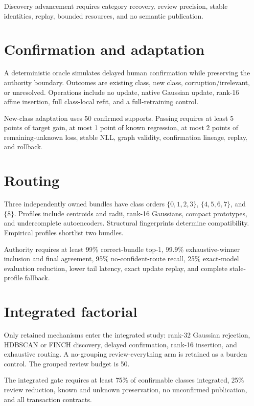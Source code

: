 \documentclass[12pt,oneside]{report}
\begin{document}
Discovery advancement requires category recovery, review precision, stable
identities, replay, bounded resources, and no semantic publication.

\section{Confirmation and adaptation}

A deterministic oracle simulates delayed human confirmation while preserving
the authority boundary. Outcomes are existing class, new class,
corruption/irrelevant, or unresolved. Operations include no update, native
Gaussian update, rank-16 affine insertion, full class-local refit, and a
full-retraining control.

New-class adaptation uses 50 confirmed supports. Passing requires at least
5 points of target gain, at most 1 point of known regression, at most 2 points
of remaining-unknown loss, stable NLL, graph validity, confirmation lineage,
replay, and rollback.

\section{Routing}

Three independently owned bundles have class orders $\{0,1,2,3\}$,
$\{4,5,6,7\}$, and $\{8\}$. Profiles include centroids and radii, rank-16
Gaussians, compact prototypes, and undercomplete autoencoders. Structural
fingerprints determine compatibility. Empirical profiles shortlist two
bundles.

Authority requires at least 99\% correct-bundle top-1, 99.9\% exhaustive-winner
inclusion and final agreement, 95\% no-confident-route recall, 25\% exact-model
evaluation reduction, lower tail latency, exact update replay, and complete
stale-profile fallback.

\section{Integrated factorial}

Only retained mechanisms enter the integrated study: rank-32 Gaussian
rejection, HDBSCAN or FINCH discovery, delayed confirmation, rank-16 insertion,
and exhaustive routing. A no-grouping review-everything arm is retained as a
burden control. The grouped review budget is 50.

The integrated gate requires at least 75\% of confirmable classes integrated,
25\% review reduction, known and unknown preservation, no unconfirmed
publication, and all transaction contracts.
\end{document}
